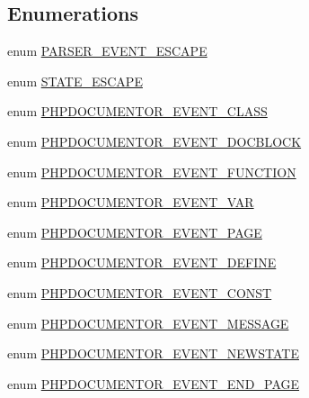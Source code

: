 \subsection*{\-Enumerations}
\begin{DoxyCompactItemize}
\item 
enum \hyperlink{_parser_8inc_aebe69f3bef6c65c0edb5878c3f243ea9}{\-P\-A\-R\-S\-E\-R\-\_\-\-E\-V\-E\-N\-T\-\_\-\-E\-S\-C\-A\-P\-E} 
\item 
enum \hyperlink{_parser_8inc_a67d501e9252a1e649b8bc2c8e399e240}{\-S\-T\-A\-T\-E\-\_\-\-E\-S\-C\-A\-P\-E} 
\item 
enum \hyperlink{_parser_8inc_a0efe263a42d9f39780f102ff556bbbb2}{\-P\-H\-P\-D\-O\-C\-U\-M\-E\-N\-T\-O\-R\-\_\-\-E\-V\-E\-N\-T\-\_\-\-C\-L\-A\-S\-S} 
\item 
enum \hyperlink{_parser_8inc_acfc9750b042b06cfa92894ba68a29cfa}{\-P\-H\-P\-D\-O\-C\-U\-M\-E\-N\-T\-O\-R\-\_\-\-E\-V\-E\-N\-T\-\_\-\-D\-O\-C\-B\-L\-O\-C\-K} 
\item 
enum \hyperlink{_parser_8inc_ae0e38e3754e6e852a66722c491f60d2d}{\-P\-H\-P\-D\-O\-C\-U\-M\-E\-N\-T\-O\-R\-\_\-\-E\-V\-E\-N\-T\-\_\-\-F\-U\-N\-C\-T\-I\-O\-N} 
\item 
enum \hyperlink{_parser_8inc_a48dd6374eb05305c373263a131473540}{\-P\-H\-P\-D\-O\-C\-U\-M\-E\-N\-T\-O\-R\-\_\-\-E\-V\-E\-N\-T\-\_\-\-V\-A\-R} 
\item 
enum \hyperlink{_parser_8inc_a326c2faea9cdcf4699fc5f1df366046b}{\-P\-H\-P\-D\-O\-C\-U\-M\-E\-N\-T\-O\-R\-\_\-\-E\-V\-E\-N\-T\-\_\-\-P\-A\-G\-E} 
\item 
enum \hyperlink{_parser_8inc_aa01af68b9c89f1ea1d470c03c34604a7}{\-P\-H\-P\-D\-O\-C\-U\-M\-E\-N\-T\-O\-R\-\_\-\-E\-V\-E\-N\-T\-\_\-\-D\-E\-F\-I\-N\-E} 
\item 
enum \hyperlink{_parser_8inc_abfb1e83c0e82789eab869f60899a85ce}{\-P\-H\-P\-D\-O\-C\-U\-M\-E\-N\-T\-O\-R\-\_\-\-E\-V\-E\-N\-T\-\_\-\-C\-O\-N\-S\-T} 
\item 
enum \hyperlink{_parser_8inc_a839fb4fb9f4c0bfe8f0caad3230b91ee}{\-P\-H\-P\-D\-O\-C\-U\-M\-E\-N\-T\-O\-R\-\_\-\-E\-V\-E\-N\-T\-\_\-\-M\-E\-S\-S\-A\-G\-E} 
\item 
enum \hyperlink{_parser_8inc_ad678db7d1bfd0a489ae21928265e4351}{\-P\-H\-P\-D\-O\-C\-U\-M\-E\-N\-T\-O\-R\-\_\-\-E\-V\-E\-N\-T\-\_\-\-N\-E\-W\-S\-T\-A\-T\-E} 
\item 
enum \hyperlink{_parser_8inc_ae801f87687a5cf37ab302d74f8de1fee}{\-P\-H\-P\-D\-O\-C\-U\-M\-E\-N\-T\-O\-R\-\_\-\-E\-V\-E\-N\-T\-\_\-\-E\-N\-D\-\_\-\-P\-A\-G\-E} 
\item 

\end{DoxyCompactItemize}
